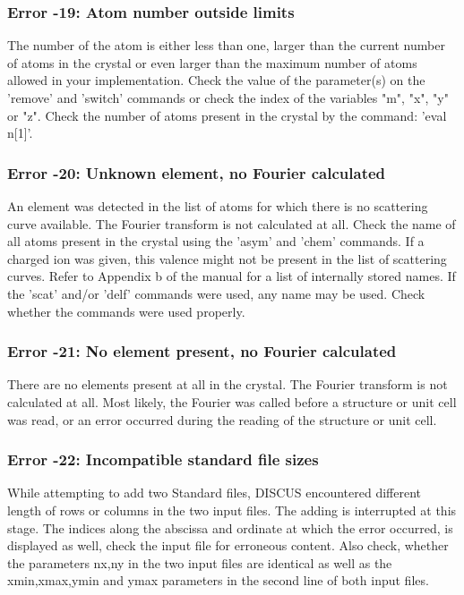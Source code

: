 \subsubsection{Error -19: Atom number outside limits}
\par
The number of the atom is either less than one, larger than the current 
number of atoms in the crystal or even larger than the maximum 
number of atoms allowed in your implementation. 
Check the value of the parameter(s) on the 'remove' and 'switch' 
commands or check the index of the variables "m", "x", "y" or "z". 
Check the number of atoms present in the crystal by the command: 
'eval n[1]'. 
\subsubsection{Error -20: Unknown element, no Fourier calculated}
\par
An element was detected in the list of atoms for which there is no 
scattering curve available. The Fourier transform is not calculated 
at all. Check the name of all atoms present in the crystal using 
the 'asym' and 'chem' commands. If a charged ion was given, this 
valence might not be present in the list of scattering curves. 
Refer to Appendix b of the manual for a list of internally stored 
names. 
If the 'scat' and/or 'delf' commands were used, any name may be used. 
Check whether the commands were used properly. 
\subsubsection{Error -21: No element present, no Fourier calculated}
\par
There are no elements present at all in the crystal. The Fourier 
transform is not calculated at all. Most likely, the Fourier 
was called before a structure or unit cell was read, or an error 
occurred during the reading of the structure or unit cell. 
\subsubsection{Error -22: Incompatible standard file sizes}
\par
While attempting to add two Standard files, DISCUS encountered 
different length of rows or columns in the two input files. The 
adding is interrupted at this stage. The indices along the 
abscissa and ordinate at which the error occurred, is displayed 
as well, check the input file for erroneous content. 
Also check, whether the parameters nx,ny in the two input files 
are identical as well as the xmin,xmax,ymin and ymax parameters 
in the second line of both input files. 
